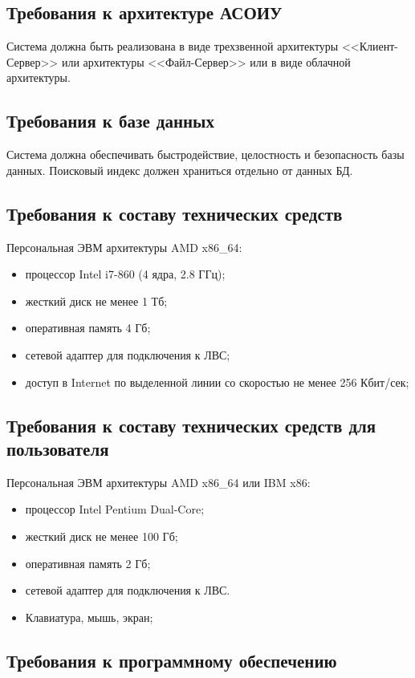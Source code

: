 \documentclass[russian,utf8,emptystyle]{eskdtext}
\begin{document}
\subsection{Требования к архитектуре АСОИУ}

Система должна быть реализована в виде трехзвенной архитектуры <<Клиент-Сервер>> или архитектуры <<Файл-Сервер>> или в виде облачной архитектуры.

\subsection{Требования к базе данных}
Система должна обеспечивать быстродействие, целостность и безопасность базы данных. Поисковый индекс должен храниться отдельно от данных БД.

\subsection{Требования к составу технических средств}

Персональная ЭВМ архитектуры AMD x86\_64:
\begin{itemize}
\item процессор Intel i7-860 (4 ядра, 2.8 ГГц);
\item жесткий диск не менее 1 Тб;
\item оперативная память 4 Гб;
\item сетевой адаптер для подключения к ЛВС;
\item доступ в Internet по выделенной линии со скоростью не менее 256 Кбит/сек;
\end{itemize}

\subsection{Требования к составу технических средств для пользователя}

Персональная ЭВМ архитектуры AMD x86\_64 или IBM x86:
\begin{itemize}
\item процессор Intel Pentium Dual-Core;
\item жесткий диск не менее 100 Гб;
\item оперативная память 2 Гб;
\item сетевой адаптер для подключения к ЛВС.
\item Клавиатура, мышь, экран;
\end{itemize}

\subsection{Требования к программному обеспечению}
\end{document}
